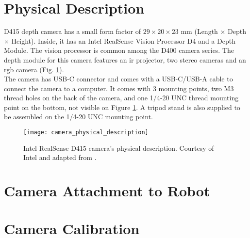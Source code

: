\section{Physical Description}
\label{sec:vision_system_physical_description}

D415 depth camera has a small form factor of $29 \times 20 \times 23$ \si{\milli\meter} (Length $\times$ Depth $\times$ Height). Inside, it has an Intel\textregistered{} RealSense\texttrademark{} Vision Processor D4 and a Depth Module. The vision processor is common among the D400 camera series. The depth module for this camera features an \gls{ir} projector, two stereo cameras and an \gls{rgb} camera (Fig. \ref{fig:camera_physical_description}).\\

The camera has USB-C connector and comes with a USB-C/USB-A cable to connect the camera to a computer. It comes with 3 mounting points, two M3 thread holes on the back of the camera, and one 1/4‑20 UNC thread mounting point on the bottom, not visible on Figure \ref{fig:camera_physical_description}. A tripod stand is also supplied to be assembled on the 1/4-20 UNC mounting point.

\begin{figure}[htbp]
	\centering
	\texttt{[image: camera\_physical\_description]}
	\caption{Intel\textregistered{} RealSense\texttrademark{} D415 camera's physical description. Courtesy of Intel\textregistered{} and adapted from \cite{IntelRealSense_depth_camera_d415}.}
	\label{fig:camera_physical_description}
\end{figure}


\section{Camera Attachment to Robot}
\label{sec:vision_system_camera_attachment}


\section{Camera Calibration}
\label{sec:vision_system_camera_calibration}



